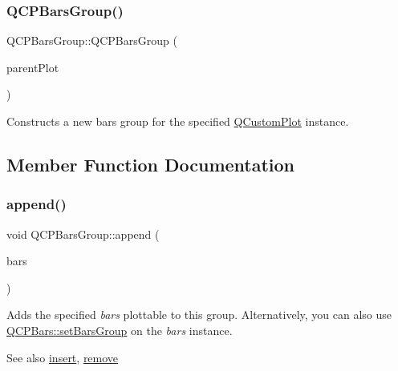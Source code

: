 \subsubsection{\texorpdfstring{Q\+C\+P\+Bars\+Group()}{QCPBarsGroup()}}
{\footnotesize\ttfamily Q\+C\+P\+Bars\+Group\+::\+Q\+C\+P\+Bars\+Group (\begin{DoxyParamCaption}\item[{\hyperlink{classQCustomPlot}{Q\+Custom\+Plot} $\ast$}]{parent\+Plot }\end{DoxyParamCaption})\hspace{0.3cm}{\ttfamily [explicit]}}

Constructs a new bars group for the specified \hyperlink{classQCustomPlot}{Q\+Custom\+Plot} instance. 

\subsection{Member Function Documentation}
\mbox{\label{classQCPBarsGroup_a809ed63cc4ff7cd5b0b8c96b470163d3}} 
\subsubsection{\texorpdfstring{append()}{append()}}
{\footnotesize\ttfamily void Q\+C\+P\+Bars\+Group\+::append (\begin{DoxyParamCaption}\item[{\hyperlink{classQCPBars}{Q\+C\+P\+Bars} $\ast$}]{bars }\end{DoxyParamCaption})}

Adds the specified {\itshape bars} plottable to this group. Alternatively, you can also use \hyperlink{classQCPBars_aedd1709061f0b307c47ddb45e172ef9a}{Q\+C\+P\+Bars\+::set\+Bars\+Group} on the {\itshape bars} instance.

\begin{DoxySeeAlso}{See also}
\hyperlink{classQCPBarsGroup_a309a5f7233db189f3ea9c2d04ece6c13}{insert}, \hyperlink{classQCPBarsGroup_a215e28a5944f1159013a0e19169220e7}{remove} 
\end{DoxySeeAlso}
\mbox{\label{classQCPBarsGroup_a6e4f4e86abbec6a9342f204ef82abef8}} 
